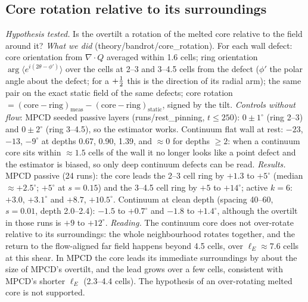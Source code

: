 \documentclass[11pt,a4paper]{article}
\begin{document}
\subsection{Core rotation relative to its surroundings}
\emph{Hypothesis tested.} Is the overtilt a rotation of the melted core relative to the field around it? \emph{What we did} (theory/bandrot/core\_rotation).
For each wall defect: core orientation from $\nabla\cdot Q$ averaged within 1.6 cells; ring orientation $\arg\langle e^{i(2\theta-\phi')}\rangle$ over the cells at 2--3 and 3--4.5 cells
from the defect ($\phi'$ the polar angle about the defect; for a $+\tfrac12$ this is the direction of its radial arm); the same pair on the exact static field
of the same defects; core rotation $=(\text{core}-\text{ring})_\mathrm{meas}-(\text{core}-\text{ring})_\mathrm{static}$, signed by the tilt. \emph{Controls without flow}:
MPCD seeded passive layers (runs/rest\_pinning, $t\le250$): $0\pm1^\circ$ (ring 2--3) and $0\pm2^\circ$ (ring 3--4.5), so the estimator works. Continuum flat wall at
rest: $-23$, $-13$, $-9^\circ$ at depths 0.67, 0.90, 1.39, and $\approx0$ for depths $\ge2$: when a continuum core sits within $\approx1.5$ cells of the wall it no longer
looks like a point defect and the estimator is biased, so only deep continuum defects can be read.
\emph{Results.} MPCD passive (24 runs): the core leads the 2--3 cell ring by $+1.3$ to $+5^\circ$ (median $\approx+2.5^\circ$; $+5^\circ$ at $s=0.15$) and the 3--4.5 cell ring by
$+5$ to $+14^\circ$; active $k=6$: $+3.0$, $+3.1^\circ$ and $+8.7$, $+10.5^\circ$. Continuum at clean depth (spacing 40--60, $s=0.01$, depth 2.0--2.4): $-1.5$ to $+0.7^\circ$ and
$-1.8$ to $+1.4^\circ$, although the overtilt in those runs is $+9$ to $+12^\circ$.
\emph{Reading.} The continuum core does not over-rotate relative to its surroundings: the whole neighbourhood rotates together, and the return to the
flow-aligned far field happens beyond 4.5 cells, over $\ell_E\approx7.6$ cells at this shear. In MPCD the core leads its immediate surroundings by about
the size of MPCD's overtilt, and the lead grows over a few cells, consistent with MPCD's shorter $\ell_E$ (2.3--4.4 cells). The hypothesis of an
over-rotating melted core is not supported.
\end{document}
